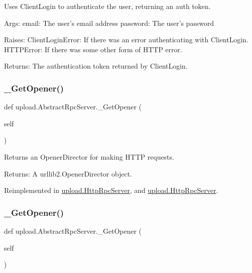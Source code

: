 \begin{DoxyVerb}Uses ClientLogin to authenticate the user, returning an auth token.

Args:
  email:    The user's email address
  password: The user's password

Raises:
  ClientLoginError: If there was an error authenticating with ClientLogin.
  HTTPError: If there was some other form of HTTP error.

Returns:
  The authentication token returned by ClientLogin.
\end{DoxyVerb}
 \mbox{\label{classupload_1_1_abstract_rpc_server_a388a9974eab1157ba4785e2ab2c33be9}} 
\subsubsection{\texorpdfstring{\_GetOpener()}{\_GetOpener()}\hspace{0.1cm}{\footnotesize\ttfamily [1/2]}}
{\footnotesize\ttfamily def upload.\+Abstract\+Rpc\+Server.\+\_\+\+Get\+Opener (\begin{DoxyParamCaption}\item[{}]{self }\end{DoxyParamCaption})\hspace{0.3cm}{\ttfamily [private]}}

\begin{DoxyVerb}Returns an OpenerDirector for making HTTP requests.

Returns:
  A urllib2.OpenerDirector object.
\end{DoxyVerb}
 

Reimplemented in \mbox{\hyperlink{classupload_1_1_http_rpc_server_a4685030df704ec17f020c8790108a05a}{upload.\+Http\+Rpc\+Server}}, and \mbox{\hyperlink{classupload_1_1_http_rpc_server_a4685030df704ec17f020c8790108a05a}{upload.\+Http\+Rpc\+Server}}.

\mbox{\label{classupload_1_1_abstract_rpc_server_a388a9974eab1157ba4785e2ab2c33be9}} 
\subsubsection{\texorpdfstring{\_GetOpener()}{\_GetOpener()}\hspace{0.1cm}{\footnotesize\ttfamily [2/2]}}
{\footnotesize\ttfamily def upload.\+Abstract\+Rpc\+Server.\+\_\+\+Get\+Opener (\begin{DoxyParamCaption}\item[{}]{self }\end{DoxyParamCaption})\hspace{0.3cm}{\ttfamily [private]}}

